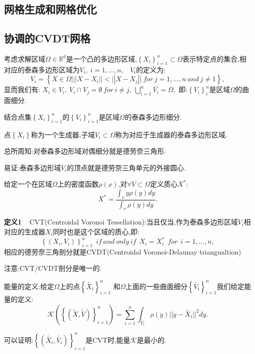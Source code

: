 \documentclass[9pt, a4paper,eqno]{article}
\theoremstyle{plain}
\begin{document}
\begin{CJK}{UTF8}{gkai}
\section{网格生成和网格优化}
\subsection{协调的CVDT网格}
考虑求解区域$\Omega \in \mathbb{R}^{d}$是一个凸的多边形区域,$\left\lbrace X_{i} \right\rbrace _{i=1}^{n} \subset \Omega$表示特定点的集合,相对应的泰森多边形区域为$V_{i},~i=1,...,n$,~~$V_{i}$的定义为:$$V_{i} = \left\lbrace X \in \Omega| ||X-X_{i}|| < ||X-X_{j}|| ~for~ j=1,...,n~ and~ j \neq 1   \right\rbrace ,$$
显而我们有: $X_{i} \in V_{i},~V_{i} \cap V_{j} = \emptyset ~ for ~ i \neq j,~ \bigcup\limits _{i=1}^{n} \overline{V_{i}} = \overline{\Omega},$
即:$\left\lbrace V_{i}  \right\rbrace _{i}^{n}$是区域$\Omega$的曲面细分.

结合点集$\left\lbrace X_{i} \right\rbrace _{i=1}^{n}$的$\left\lbrace V_{i} \right\rbrace _{i=1}^{n}$是区域$\Omega$的泰森多边形细分.

点$\left\lbrace X_{i} \right\rbrace$称为一个生成器,子域$V_{i} \subset \Omega$称为对应于生成器的泰森多边形区域.

总所周知:对泰森多边形域对偶细分就是德劳奈三角形.

易证:泰森多边形域$V_{i}$的顶点就是德劳奈三角单元的外接圆心.

给定一个在区域$\Omega$上的密度函数$\rho (x)$,对$\forall V \subset \Omega$定义质心$X^{*}$:$$X^{*}=\dfrac{\int _{v}y \rho (y)dy}{\int _{v} \rho(y)dy}.$$

{\bf 定义1~~}CVT(Centroidal Voronoi Tessellation):当且仅当,作为泰森多边形区域$V_{i}$相对应的生成器$X_{i}$同时也是这个区域的质心,即:$$\left\lbrace (X_{i},V_{i})  \right\rbrace_{i=1}^{n} ~~if~and ~ only~ if  ~~ X_{i} = X_{i}^{*} ~~for ~~i=1,...,n,$$
相应的德劳奈三角剖分就是CVDT(Centroidal Voronoi-Delaunay triangualtion)

注意:CVT/CVDT剖分是唯一的.

能量的定义:给定$\Omega$上的点$\left\lbrace \widetilde{X_{i}}  \right\rbrace_{i=1}^{n}$ 和$\Omega$上面的一些曲面细分$\left\lbrace \widetilde{V_{i}}  \right\rbrace_{i=1}^{n}$我们给定能量的定义: $$\mathcal{K}\left(\left\lbrace \left(\widetilde{X},\widetilde{V}\right)  \right\rbrace _{i=1}^{n}\right)= \sum _{i=1}^{n} \int _{\widetilde{V_{i}}} \rho (y)||y-\widetilde{X_{i}}||^{2}dy.$$

可以证明:$\left\lbrace \left( \widetilde{X_{i}},\widetilde{V_{i}} \right) \right\rbrace_{i=1}^{n}$是CVT时,能量$\mathcal{K}$是最小的.


\end{CJK}
\end{document}
